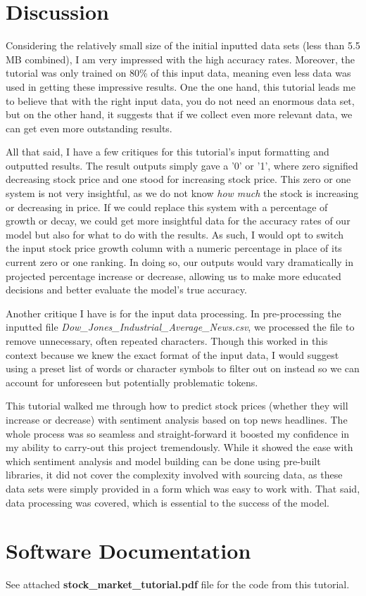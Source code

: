 \documentclass[10pt,twocolumn]{article}
\begin{document}
\section{Discussion}

Considering the relatively small size of the initial inputted data sets (less than 5.5 MB combined), I am very impressed with the high accuracy rates. Moreover, the tutorial was only trained on 80\% of this input data, meaning even less data was used in getting these impressive results. One the one hand, this tutorial leads me to believe that with the right input data, you do not need an enormous data set, but on the other hand, it suggests that if we collect even more relevant data, we can get even more outstanding results.

All that said, I have a few critiques for this tutorial's input formatting and outputted results. The result outputs simply gave a '0' or '1', where zero signified decreasing stock price and one stood for increasing stock price. This zero or one system is not very insightful, as we do not know \textit{how much} the stock is increasing or decreasing in price. If we could replace this system with a percentage of growth or decay, we could get more insightful data for the accuracy rates of our model but also for what to do with the results. As such, I would opt to switch the input stock price growth column with a numeric percentage in place of its current zero or one ranking. In doing so, our outputs would vary dramatically in projected percentage increase or decrease, allowing us to make more educated decisions and better evaluate the model's true accuracy.

Another critique I have is for the input data processing. In pre-processing the inputted file \textit{Dow\_Jones\_Industrial\_Average\_News.csv}, we processed the file to remove unnecessary, often repeated characters. Though this worked in this context because we knew the exact format of the input data, I would suggest using a preset list of words or character symbols to filter out on instead so we can account for unforeseen but potentially problematic tokens.

This tutorial walked me through how to predict stock prices (whether they will increase or decrease) with sentiment analysis based on top news headlines. The whole process was so seamless and straight-forward it boosted my confidence in my ability to carry-out this project tremendously. While it showed the ease with which sentiment analysis and model building can be done using pre-built libraries, it did not cover the complexity involved with sourcing data, as these data sets were simply provided in a form which was easy to work with. That said, data processing was covered, which is essential to the success of the model.

\section{Software Documentation}

See attached \textbf{stock\_market\_tutorial.pdf} file for the code from this tutorial.


\printbibliography 
\end{document}
